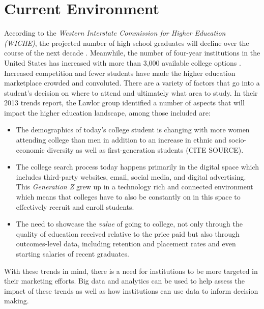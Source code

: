 \documentclass[sigconf]{acmart}
\begin{document}
\section{Current Environment}

According to the \textit{Western Interstate Commission for Higher Education (WICHE)}, the projected number of high school graduates will decline over the course of the next decade \cite{Bransberger2017}. Meanwhile, the number of four-year institutions in the United States has increased with more than 3,000 available college options \cite{EducationStatistics2015}. Increased competition and fewer students have made the higher education marketplace crowded and convoluted. There are a variety of factors that go into a student's decision on where to attend and ultimately what area to study. In their 2013 trends report, the Lawlor group \cite{Research2014} identified a number of aspects that will impact the higher education landscape, among those included are:

\begin{itemize}
\item The demographics of today's college student is changing with more women attending college than men in addition to an increase in ethnic and socio-economic diversity as well as first-generation students (CITE SOURCE).
\vspace{5mm}
\item The college search process today happens primarily in the digital space which includes third-party websites, email, social media, and digital advertising. This \textit{Generation Z} grew up in a technology rich and connected environment which means that colleges have to also be constantly on in this space to effectively recruit and enroll students.
\vspace{5mm}
\item The need to showcase the \textit{value} of going to college, not only through the quality of education received relative to the price paid but also through outcomes-level data, including retention and placement rates and even starting salaries of recent graduates. 
\end{itemize}
With these trends in mind, there is a need for institutions to be more targeted in their marketing efforts. Big data and analytics can be used to help assess the impact of these trends as well as how institutions can use data to inform decision making.
\end{document}
